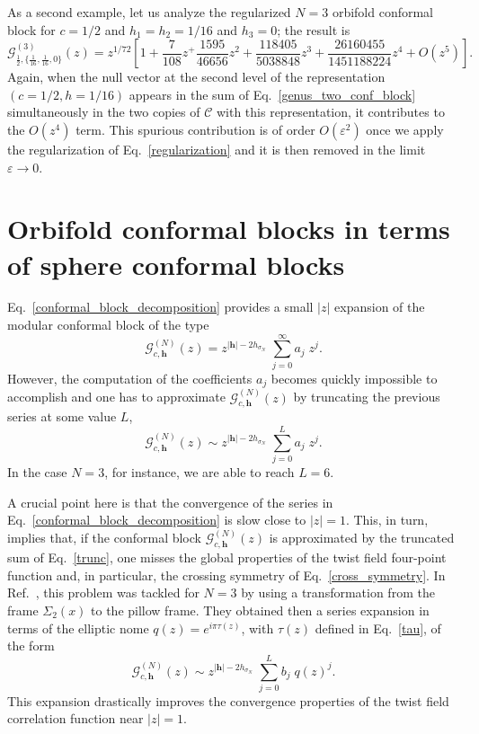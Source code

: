 \documentclass[a4paper,11pt]{article}
\begin{document}
As a second example, let us analyze the regularized $N=3$ orbifold conformal block for $c=1/2$ and $h_1=h_2=1/16$
and $h_3=0$; the result is 
\begin{equation}
 \mathcal{G}_{\frac{1}{2}, \{\frac{1}{16}, \frac{1}{16}, 0\}}^{(3)}(z)=
 z^{1/72}\left[1+\frac{7}{108}z^+\frac{1595}{46656}z^2+
 \frac{118405}{5038848}z^3+\frac{26160455}{1451188224}z^4+O(z^5)\right].
\end{equation}
Again, when the null vector at the second level 
of the representation $(c=1/2, h=1/16)$ appears in the sum of Eq.~\eqref{genus_two_conf_block} 
simultaneously in the two copies of $\mathcal{C}$ with this representation, 
it contributes to the $O(z^4)$ term. This spurious contribution is of order $O(\varepsilon^2)$ 
once we apply the regularization of Eq.~\eqref{regularization} and it is then removed in the
limit $\varepsilon\to0$.


\section{Orbifold conformal blocks in terms of sphere conformal blocks}\label{sec:sphere_conf_blocks}
Eq.~\eqref{conformal_block_decomposition} provides a small $|z|$ expansion of the modular conformal block of the type
\begin{equation}
\mathcal{G}_{c,\boldsymbol{h}}^{(N)}(z) =z^{|\boldsymbol{h}|-2h_{\sigma_N}} \;\sum_{j=0}^{\infty} a_j \; z^j.
\end{equation}
However, the computation of the coefficients $a_j$ becomes quickly impossible to accomplish and one has to approximate $\mathcal{G}_{c,\boldsymbol{h}}^{(N)}(z)$ by truncating the previous series at some value $L$,
\begin{equation}\label{trunc}
\mathcal{G}_{c,\boldsymbol{h}}^{(N)}(z) \sim z^{|\boldsymbol{h}|-2h_{\sigma_N}} \;\sum_{j=0}^{L} a_j \; z^j.
\end{equation}
In the case $N=3$, for instance, we are able to reach $L=6$.

A crucial point here is that the convergence of the series in Eq.~\eqref{conformal_block_decomposition} is slow close to  $|z|=1$. This, in turn, implies that, if the conformal block $\mathcal{G}_{c,\boldsymbol{h}}^{(N)}(z)$ is approximated by the truncated sum of Eq.~\eqref{trunc}, one misses the global properties of the twist field four-point function and, in particular, the crossing symmetry of Eq.~\eqref{cross_symmetry}. 
In Ref.~\cite{Collier}, this problem was tackled for $N=3$ by using a transformation from the frame $\Sigma_2(x)$ to the pillow frame. They  obtained then a series expansion in terms of the elliptic nome $q(z)=e^{i\pi\tau(z)}$, with $\tau(z)$ defined in Eq.~\eqref{tau}, 
of the form
\begin{equation}\label{collierap}
\mathcal{G}_{c,\boldsymbol{h}}^{(N)}(z) \sim z^{|\boldsymbol{h}|-2h_{\sigma_N}} \;\sum_{j=0}^{L} b_j \; q(z)^j.
\end{equation}
This expansion drastically improves the convergence properties of the twist field correlation function near $|z|=1$.
\end{document}
